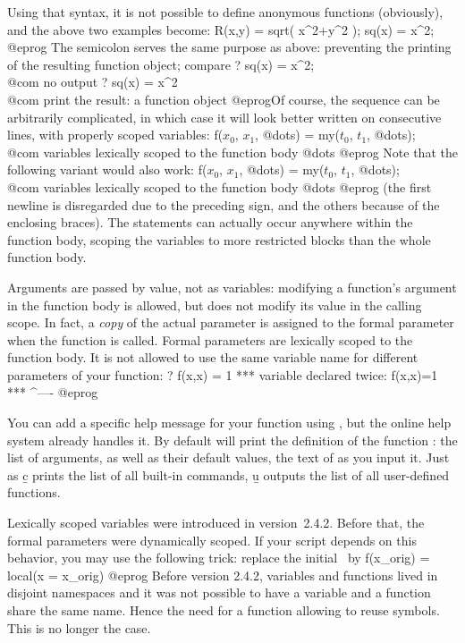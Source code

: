 \noindent Using that syntax, it is not possible to define anonymous functions
(obviously), and the above two examples become:
\bprog
R(x,y) = sqrt( x^2+y^2 );
sq(x) = x^2;
@eprog\noindent
The semicolon serves the same purpose as above: preventing the printing
of the resulting function object; compare
\bprog
? sq(x) = x^2;  \\@com no output
? sq(x) = x^2   \\@com print the result: a function object
@eprog\noindent Of course, the sequence  can be arbitrarily
complicated, in which case it will look better written on consecutive lines,
with properly scoped variables:
\bprogpart
{
f($x_0$, $x_1$, @dots) =
  my($t_0$, $t_1$, @dots); \\@com variables lexically scoped to the function body
  @dots
}
@eprog \noindent Note that the following variant would also work:
\bprogpart
f($x_0$, $x_1$, @dots) =
{
  my($t_0$, $t_1$, @dots); \\@com variables lexically scoped to the function body
  @dots
}
@eprog \noindent
(the first newline is disregarded due to the preceding \kbd{=} sign, and the
others because of the enclosing braces). The  statements can actually
occur anywhere within the function body, scoping the variables to more
restricted blocks than the whole function body.

Arguments are passed by value, not as variables: modifying a function's
argument in the function body is allowed, but does not modify its value in the
calling scope. In fact, a \emph{copy} of the actual parameter is assigned to
the formal parameter when the function is called. Formal parameters are
lexically scoped to the function body. It is not allowed to use the same
variable name for different parameters of your function:
\bprog
? f(x,x) = 1
  ***   variable declared twice: f(x,x)=1
  ***                                ^----
@eprog

You can add a specific help message for your function using ,
but the online help system already handles it. By default 
will print the definition of the function : the list of arguments,
as well as their default values, the text of  as you input it.
Just as \b{c} prints the list of all built-in commands, \b{u} outputs the
list of all user-defined functions.

 Lexically scoped
variables were introduced in version~2.4.2. Before that, the formal
parameters were dynamically scoped. If your script depends on this behavior,
you may use the following trick: replace the initial  \ by
\bprog
f(x_orig) = local(x = x_orig)
@eprog
 Before version
2.4.2, variables and functions lived in disjoint namespaces and it was not
possible to have a variable and a function share the same name. Hence the
need for a  function allowing to reuse symbols. This is no longer
the case.

